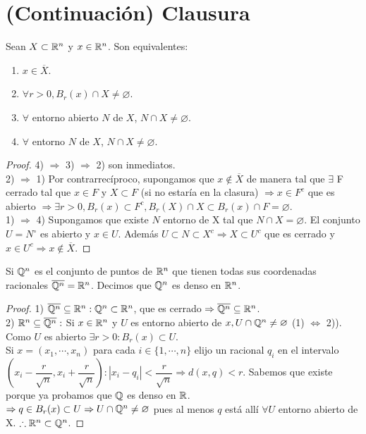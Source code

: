 \section{(Continuación) Clausura}

\begin{prop}
  Sean $X \subset \mathbb{R}^n$ y $x \in \mathbb{R}^n$. Son equivalentes:
  \begin{enumerate}
    \item $x \in \overline{X}$.
    \item $\forall r > 0, B_r(x) \cap X \neq \varnothing$.
    \item $\forall$ entorno abierto $N$ de $X$, $N \cap X \neq \varnothing$.
    \item $\forall$ entorno $N$ de $X$, $N \cap X \neq \varnothing$.
  \end{enumerate}

  \begin{proof}
    4) $\Rightarrow$ 3) $\Rightarrow$ 2) son inmediatos. \\
    2) $\Rightarrow$ 1) Por contrarrecíproco, supongamos que $x \notin \overline{X}$ de manera tal que $\exists$ F cerrado tal que $x \in F$ y $X \subset F$ (si no estaría en la clasura) $\Rightarrow x \in F^c$ que es abierto $\Rightarrow \exists r > 0, B_r(x) \subset F^c, B_r(X) \cap X \subset B_r(x) \cap F = \varnothing$. \\
    1) $\Rightarrow$ 4) Supongamos que existe $N$ entorno de X tal que $N \cap X = \varnothing$. El conjunto $U = N^{\circ}$ es abierto y $x \in U$. Además $U \subset N \subset X^c \Rightarrow X \subset U^c$ que es cerrado y $x \in U^c \Rightarrow x \notin \overline{X}$.
  \end{proof}
\end{prop}

\begin{eg}
  Si $\mathbb{Q}^n$ es el conjunto de puntos de $\mathbb{R}^n$ que tienen todas sus coordenadas racionales $\overline{\mathbb{Q}^n} = \mathbb{R}^n$. Decimos que $\mathbb{Q}^n$ es denso en $\mathbb{R}^n$.

  \begin{proof}
    1) $\overline{\mathbb{Q}^n} \subseteq \mathbb{R}^n : \mathbb{Q}^n \subset \mathbb{R}^n$, que es cerrado $\Rightarrow \overline{\mathbb{Q}^n} \subseteq \mathbb{R}^n$. \\
    2) $\mathbb{R}^n \subseteq \overline{\mathbb{Q}^n}:$ Si $x \in \mathbb{R}^n$ y $U$ es entorno abierto de $x, U \cap \mathbb{Q}^n \neq \varnothing$ (1) $\iff$ 2)). Como $U$ es abierto $\exists r > 0 : B_r(x) \subset U$. \\
    Si $x = (x_1, \cdots, x_n)$ para cada $i \in \{1, \cdots, n\}$ elijo un racional $q_i$ en el intervalo $(x_i - \dfrac{r}{\sqrt{n}}, x_i + \dfrac{r}{\sqrt{n}}) : |x_i - q_i| < \dfrac{r}{\sqrt{n}} \Rightarrow d(x, q) < r$. Sabemos que existe porque ya probamos que $\mathbb{Q}$ es denso en $\mathbb{R}$. \\
    $\Rightarrow q \in B_r(x) \subset U \Rightarrow U \cap \mathbb{Q}^n \neq \varnothing$ pues al menos $q$ está allí $\forall U$ entorno abierto de X.
    $\therefore \mathbb{R}^n \subset \mathbb{Q}^n$.
  \end{proof}
\end{eg}

